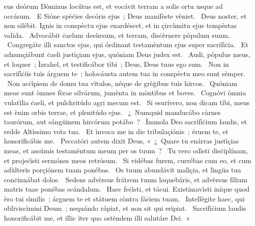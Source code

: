 { }
{%
eus deórum Dòminus locútus est, et vocávit terram a solis ortu usque ad occásum. 
~E Sióne spèċies decóris ejus~; Deus manifèste vèniet. 
~Deus noster, et non silébit. Ignis in conspèctu ejus exardéscet, et in çircùmitu ejus tempèstas valida. 
~Advocábit ċaelum desùrsum, et terram, disċèrnere pòpulum suum. 
~Congregáte illi sanctos ejus, qui órdinant testamèntum ejus super sacrifìċia. 
~Et adnunçiábunt ċaeli justìçiam ejus, quóniam Deus judex est. 
~Audi, pòpulus meus, et loquer~; Ìzrahel, et testificábor tìbi~; Deus, Deus tuus ego sum. 
~Non in sacrifìċiïs tuïs árguem te~; holocáusta autem tua in conspèctu meo sunt sèmper. 
~Non acċìpiem de domu tua vìtulos, néque de grèġibus tuïs hircos. 
~Quóniam meae sunt òmnes fèrae silvárum, jumènta in mòntibus et boves. 
~Cognóvi òmnia vulatìlia ċaeli, et pulchritúdo agri mecum est. 
~Si esurívero, non dicam tìbi, meus est ènim orbis terrae, et plenitúdo ejus. 
~¿~Numquid manducábo càrnes taurórum, aut sángüinem hircórum potábo~? 
~Ìmmola Deo sacrifìċium laudis, et redde Altìssimo vota tua. 
~Et ìnvoca me in die tribulaçiónis~; éruem te, et honorificábis me. 
~Peccatóri autem dixit Deus, «~¿~Quare tu enárras justìçias meas, et assúmis testamèntum meum per os tuum~? 
~Tu vero odìsti disċiplínam, et projeċìsti sermónes meos retrósum. 
~Si vidébas furem, currébas cum eo, et cum adùlterïs porçiónem tuam ponébas. 
~Os tuum abundávit malìçia, et lìngüa tua conċinnábat dolos. 
~Sedens advèrsus frátrem tuum loquebáris, et advèrsus fílium matris tuae ponébas scándalum. 
~Haec feċìsti, et tácui. Existimavìsti iníque quod èro tui sìmilis~; árguem te et státuem còntra fàċiem tuam. 
~Intellègite haec, qui obliviscìmini Deum~; nequándo rápiat, et non sit qui erìpiat. 
~Sacrifìċium laudis honorificábit me, et illic ìter quo ostèndem illi salutáre Dei.~»
}
